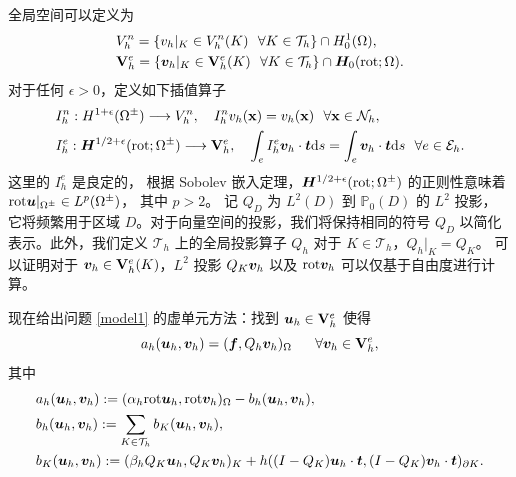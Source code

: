 全局空间可以定义为
\begin{subequations}
\label{glob_space}
\begin{align}
&    V^n_h =  \{ v_h|_K \in V^n_h(K) ~~ \forall K\in \mathcal{T}_h \}  \cap H^1_0(\Omega) ,\\
& \mathbf{V}^e_h =  \{ \boldsymbol{v}_h|_K \in \mathbf{V}^e_h(K) ~~ \forall K\in \mathcal{T}_h \}  \cap \boldsymbol{H}_0(\mathrm{rot};\Omega) .
\end{align}
\end{subequations}
对于任何 $\epsilon>0$，定义如下插值算子
\begin{subequations}
\label{interp}
\begin{align}
& I^n_h :  H^{1+\epsilon}(\Omega^{\pm}) \longrightarrow V^n_h, ~~~ I^n_hv_h(\mathbf{x}) = v_h(\mathbf{x}) ~~ \forall \mathbf{x}\in \mathcal{N}_h,  \\
& I^e_h : \boldsymbol{H}^{1/2+\epsilon}(\mathrm{rot}; \Omega^{\pm}) \longrightarrow \mathbf{V}^e_h, ~~~ \int_e I^e_h \boldsymbol{v}_h\cdot\boldsymbol{t} \mathrm{ d} s = \int_e \boldsymbol{v}_h\cdot\boldsymbol{t} \mathrm{ d} s ~~ \forall e\in \mathcal{E}_h.
\end{align}
\end{subequations}
这里的 $I^e_h$ 是良定的，
根据 Sobolev 嵌入定理，$\boldsymbol{H}^{1/2+\epsilon}(\mathrm{rot}; \Omega^{\pm})$ 的正则性意味着 
$\mathrm{rot}\boldsymbol{u}|_{\Omega^{\pm}}\in L^p(\Omega^{\pm})$，
其中 $p>2$。
记 $Q_D$ 为 $L^2(D)$ 到 $\mathbb{P}_0(D)$ 的 $L^2$ 投影，
它将频繁用于区域 $D$。对于向量空间的投影，我们将保持相同的符号 $Q_D$ 
以简化表示。此外，我们定义 $\mathcal{T}_h$ 上的全局投影算子 $Q_h$ 对于 $K \in
\mathcal{T}_h$，$Q_h|_K = Q_K$。
可以证明对于 $\boldsymbol{v}_h \in \mathbf{V}_h^e(K)$，$L^2$ 投影 $Q_K \boldsymbol{v}_h$ 以及 $\mathrm{rot} \boldsymbol{v}_h$ 可以仅基于自由度进行计算。

现在给出问题 \eqref{model1} 的虚单元方法：找到 $\boldsymbol{u}_h\in \mathbf{V}^e_h$ 使得
\begin{equation}
\label{vem0}
a_h(\boldsymbol{u}_h,\boldsymbol{v}_h) = (\boldsymbol{f},Q_h \boldsymbol{v}_h)_{\Omega} ~~~~~ \forall \boldsymbol{v}_h\in \mathbf{V}^e_h,
\end{equation}
其中
\begin{subequations}
\label{vem1}
\begin{align}
&   a_h(\boldsymbol{u}_h,\boldsymbol{v}_h) := (\alpha_h \mathrm{rot}\boldsymbol{u}_h, \mathrm{rot}\boldsymbol{v}_h)_{\Omega} - b_h(\boldsymbol{u}_h,\boldsymbol{v}_h),  \label{vem11}   \\
&   b_h(\boldsymbol{u}_h,\boldsymbol{v}_h) := \sum_{K\in\mathcal{T}_h} b_K(\boldsymbol{u}_h,\boldsymbol{v}_h),  \label{vem12}  \\
&    b_K(\boldsymbol{u}_h,\boldsymbol{v}_h) := (\beta_hQ_K \boldsymbol{u}_h,Q_K \boldsymbol{v}_h )_{K} + h ( (I-Q_K )\boldsymbol{u}_h\cdot\boldsymbol{t} ,  (I-Q_K )\boldsymbol{v}_h\cdot\boldsymbol{t} )_{\partial K}.  \label{vem13}
\end{align}
\end{subequations}


